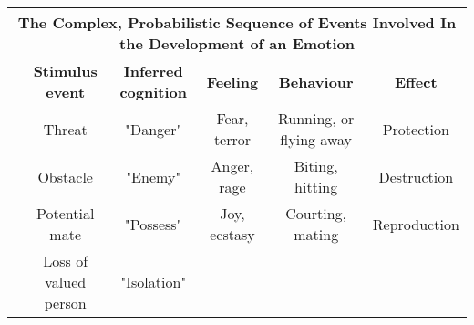 \documentclass[landscape]{article}
\begin{document}
\pagestyle{empty}
\begin{center}

\begingroup

\begin{tabular}{|l|c|c|c|c|c|}
\hline

\multicolumn{6}{|c|}{ \bf  The Complex, Probabilistic Sequence of Events Involved In the Development of an Emotion} \\ 

\hline

& {\bf Stimulus event} 
	

& {\bf Inferred cognition} 
	

& {\bf Feeling} 
	

& {\bf Behaviour} 
	

& {\bf Effect} \\
\hline
 
\definecolor{softgreen}{RGB}{144,201,144}
{\color{softgreen} \rule{0.3cm}{1cm}}
	

 & Threat 
	

& "Danger" 
	

& Fear, terror 
	

 & Running, or flying away 
	

& Protection \\ 

 
\definecolor{softred}{RGB}{255,74,74}
{\color{softred} \rule{0.3cm}{1cm}}
	

& Obstacle 
	

& "Enemy" 
	

& Anger, rage 
	

& Biting, hitting 
	

 & Destruction\\ 

 
	
\definecolor{softbrown}{RGB}{57,57,0}
{\color{softbrown} \rule{0.3cm}{1cm}}


& Potential mate 
	

& "Possess" 
	

& Joy, ecstasy 
	

& Courting, mating 
	

& Reproduction\\ 

 
	
\definecolor{softblue}{RGB}{191,207,252}
{\color{softblue} \rule{0.3cm}{1cm}}

& Loss of valued person 
	

& "Isolation" 
	


\end{tabular}
\end{center}
\end{document}
